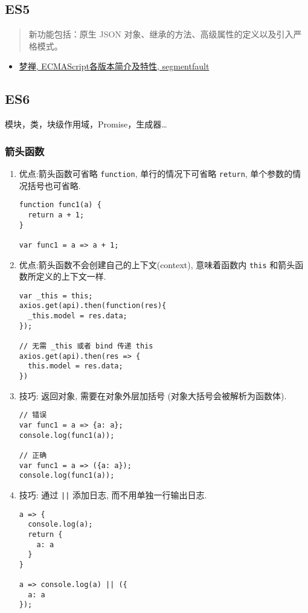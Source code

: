 \subsection{ES5}\label{es5}

\begin{quote}
新功能包括：原生 JSON 对象、继承的方法、高级属性的定义以及引入严格模式。
\end{quote}

\begin{itemize}
\tightlist
\item
  \href{http://segmentfault.com/a/1190000003493604}{梦禅,
  ECMAScript各版本简介及特性, segmentfault}
\end{itemize}

\subsection{ES6}\label{es6}

模块，类，块级作用域，Promise，生成器\ldots{}

\subsubsection{箭头函数}\label{ux7badux5934ux51fdux6570}

\begin{enumerate}
\def\labelenumi{\arabic{enumi}.}
\item
  优点:箭头函数可省略 \lstinline!function!, 单行的情况下可省略
  \lstinline!return!, 单个参数的情况括号也可省略.

\begin{lstlisting}
function func1(a) {
  return a + 1;
}

var func1 = a => a + 1;
\end{lstlisting}
\item
  优点:箭头函数不会创建自己的上下文(context), 意味着函数内
  \lstinline!this! 和箭头函数所定义的上下文一样.

\begin{lstlisting}
var _this = this;
axios.get(api).then(function(res){
  _this.model = res.data;
});

// 无需 _this 或者 bind 传递 this
axios.get(api).then(res => {
  this.model = res.data;
})
\end{lstlisting}
\item
  技巧: 返回对象, 需要在对象外层加括号 (对象大括号会被解析为函数体).

\begin{lstlisting}
// 错误
var func1 = a => {a: a};
console.log(func1(a));

// 正确
var func1 = a => ({a: a});
console.log(func1(a));
\end{lstlisting}
\item
  技巧: 通过 \lstinline!||! 添加日志, 而不用单独一行输出日志.

\begin{lstlisting}
a => {
  console.log(a);
  return {
    a: a
  }
}

a => console.log(a) || ({
  a: a
});
\end{lstlisting}
\end{enumerate}

